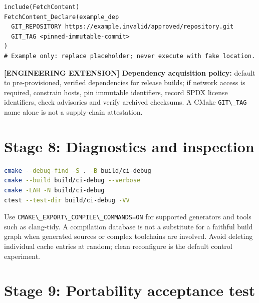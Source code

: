\documentclass[11pt,letterpaper,oneside]{report}
\providecommand{\passthrough}[1]{#1}
\begin{document}
\begin{lstlisting}
include(FetchContent)
FetchContent_Declare(example_dep
  GIT_REPOSITORY https://example.invalid/approved/repository.git
  GIT_TAG <pinned-immutable-commit>
)
# Example only: replace placeholder; never execute with fake location.
\end{lstlisting}

\textbf{{[}ENGINEERING EXTENSION{]} Dependency acquisition policy:}
default to pre-provisioned, verified dependencies for release builds; if
network access is required, constrain hosts, pin immutable identifiers,
record SPDX license identifiers, check advisories and verify archived
checksums. A CMake \passthrough{\lstinline!GIT\_TAG!} name alone is not
a supply-chain attestation.

\chapter{Stage 8: Diagnostics and
inspection}\label{stage-8-diagnostics-and-inspection}

\begin{lstlisting}[language=sh]
cmake --debug-find -S . -B build/ci-debug
cmake --build build/ci-debug --verbose
cmake -LAH -N build/ci-debug
ctest --test-dir build/ci-debug -VV
\end{lstlisting}

Use \passthrough{\lstinline!CMAKE\_EXPORT\_COMPILE\_COMMANDS=ON!} for
supported generators and tools such as clang-tidy. A compilation
database is not a substitute for a faithful build graph when generated
sources or complex toolchains are involved. Avoid deleting individual
cache entries at random; clean reconfigure is the default control
experiment.

\chapter{Stage 9: Portability acceptance
test}\label{stage-9-portability-acceptance-test}
\end{document}
